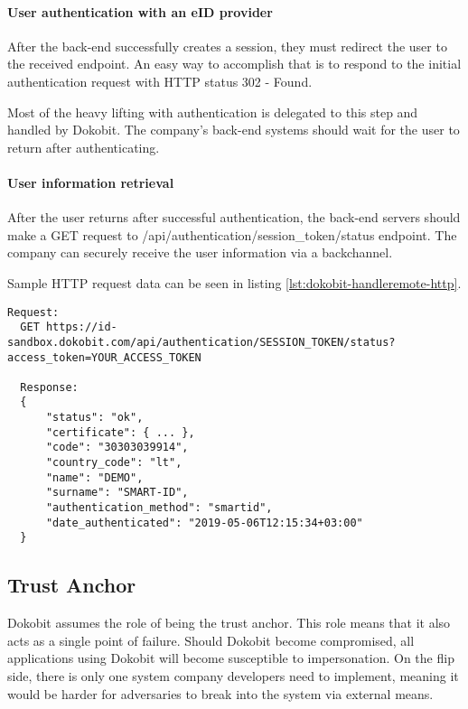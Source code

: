 \paragraph{User authentication with an eID provider}

After the back-end successfully creates a session, they must redirect the user to the received endpoint. An easy way to accomplish that is to respond to the initial authentication request with HTTP status 302 - Found.

Most of the heavy lifting with authentication is delegated to this step and handled by Dokobit. The company's back-end systems should wait for the user to return after authenticating.

\paragraph{User information retrieval}

After the user returns after successful authentication, the back-end servers should make a {GET} request to {/api/authentication/session\_token/status} endpoint. The company can securely receive the user information via a backchannel.

Sample HTTP request data can be seen in listing \ref{lst:dokobit-handleremote-http}.

\begin{lstlisting}[caption={Handling Dokobit session creation}, label={lst:dokobit-handleremote-http}]
  Request:
  GET https://id-sandbox.dokobit.com/api/authentication/SESSION_TOKEN/status?access_token=YOUR_ACCESS_TOKEN
  
  Response:
  {
      "status": "ok",
      "certificate": { ... },
      "code": "30303039914",
      "country_code": "lt",
      "name": "DEMO",
      "surname": "SMART-ID",
      "authentication_method": "smartid",
      "date_authenticated": "2019-05-06T12:15:34+03:00"
  }
\end{lstlisting}

\subsection{Trust Anchor}

Dokobit assumes the role of being the trust anchor. This role means that it also acts as a single point of failure. Should Dokobit become compromised, all applications using Dokobit will become susceptible to impersonation. On the flip side, there is only one system company developers need to implement, meaning it would be harder for adversaries to break into the system via external means.

